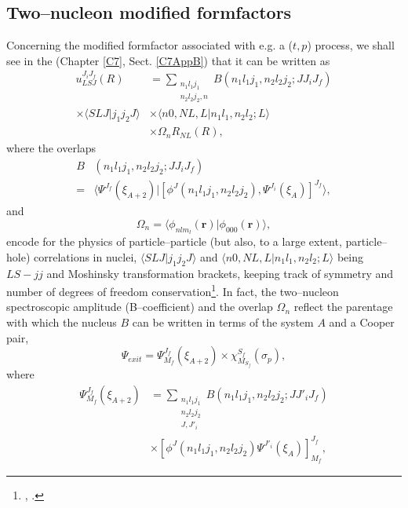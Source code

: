 \subsection{Two--nucleon modified formfactors}
Concerning the modified formfactor associated with e.g. a ($t,p$) process, we shall see in the (Chapter \ref{C7}, Sect. \ref{C7AppB}) that it can be written as
\begin{equation}\label{eq1.1.1}
\begin{split}
u_{LSJ}^{J_iJ_f}(R)&=\sum_{\substack{n_1l_1j_1\\n_2l_2j_2,n}}B(n_1l_1j_1,n_2l_2j_2;JJ_iJ_f)\\
\times\langle SLJ|j_1j_2J\rangle &\times \langle n0, NL,L|n_1l_1,n_2l_2;L\rangle\\
&\times\Omega_n R_{NL}(R),
\end{split}
\end{equation}
where the overlaps
\begin{equation}\label{eq2C2.1}
\begin{split}
B&(n_1l_1j_1,n_2l_2j_2;JJ_iJ_f)\\
=&\langle \Psi^{J_f}(\xi_{A+2})|\left[\phi^J(n_1l_1j_1,n_2l_2j_2),\Psi^{J_i}(\xi_A)\right]^{J_f}\rangle,
\end{split}
\end{equation}
and 
\begin{equation}\label{eq1.1.3}
\Omega_n=\langle \phi_{nlm_l}(\mathbf r)|\phi_{000}(\mathbf r)\rangle,
\end{equation}
encode for the physics of particle--particle (but also, to a large extent, particle--hole) correlations in nuclei, $\langle SLJ|j_1j_2J\rangle$ and $\langle n0,NL,L|n_1 l_1,n_2l_2;L\rangle$ being $LS-jj$ and Moshinsky transformation brackets, keeping track of symmetry and number of degrees of freedom conservation\footnote{\cite{Glendenning:65}, \cite{Broglia:73}.}. In fact, the two--nucleon spectroscopic amplitude (B--coefficient) and the overlap $\Omega_n$ reflect the parentage with which the nucleus $B$ can be written in terms of the system $A$ and a Cooper pair,
\begin{equation}
\Psi_{exit}=\Psi_{M_f}^{J_f}(\xi_{A+2})\times\chi^{S_f}_{M_{S_f}}(\sigma_p),
\end{equation}
where
\begin{equation}
\begin{split}
\Psi_{M_f}^{J_f}(\xi_{A+2})&=\sum_{\substack{n_1l_1j_1\\n_2l_2j_2\\J,J'_i}}B(n_1l_1j_1,n_2l_2j_2;JJ'_iJ_f)\\
&\times\left[\phi^J(n_1l_1j_1,n_2l_2j_2)\Psi^{J'_i}(\xi_A)\right]_{M_f}^{J_f},
\end{split}
\end{equation}
